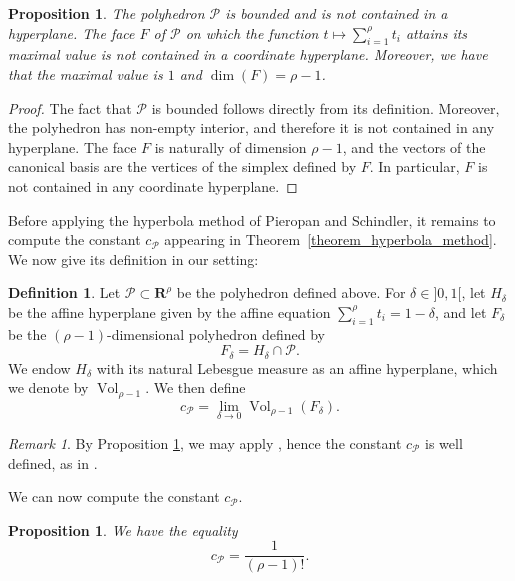 \documentclass{proc-l}
\newcommand{\R}{\mathbf{R}}
\DeclareMathOperator{\Vol}{Vol}
\newcommand{\stackP}{\mathcal{P}}
\newtheorem{prop}[theorem]{Proposition}
\theoremstyle{definition}
\newtheorem{definition}[theorem]{Definition}
\theoremstyle{remark}
\newtheorem{remark}[theorem]{Remark}
\numberwithin{equation}{section}
\begin{document}
\begin{prop}\label{proposition_assumptions_polyhedron}
    The polyhedron $\stackP$ is bounded and is not contained in a hyperplane. The face $F$  of $\mathcal{P}$ on which the function $t \mapsto \sum\limits_{i = 1}^{\rho } t_i$ attains its maximal value is not contained in a coordinate hyperplane. Moreover, we have that the maximal value is $1$ and $\dim(F) = \rho - 1$.
\end{prop}

\begin{proof}
The fact that $\stackP$ is bounded follows directly from its definition.
Moreover, the polyhedron has non-empty interior, and therefore it is not
contained in any hyperplane.
The face $F$ is naturally of dimension $\rho-1$, and the vectors of the
canonical basis are the vertices of the simplex defined by $F$.
In particular, $F$ is not contained in any coordinate hyperplane.
\end{proof}

Before applying the hyperbola method of Pieropan and Schindler,
it remains to compute the constant $c_{\stackP}$ appearing in
Theorem~\ref{theorem_hyperbola_method}. We now give its definition in our setting:

\begin{definition}\label{definition_constante_polytope_hyperbola_method}
    Let \(\stackP \subset \R^{\rho}\) be the polyhedron defined above.  For $\delta \in ]0,1[$, let $H_{\delta}$ be the affine hyperplane given by the affine equation $\sum\limits_{i = 1}^{\rho} t_i = 1 - \delta$, and let $F_{\delta}$ be the $(\rho - 1)$-dimensional polyhedron defined by 
    \[
        F_{\delta} = H_{\delta} \cap \stackP.
    \]
    We endow $H_{\delta}$ with its natural Lebesgue measure as an affine hyperplane, which we denote by $\Vol_{\rho - 1}$.  
    We then define
    \[
        c_{\stackP} = \lim_{\delta \to 0} \Vol_{\rho - 1}(F_{\delta}).
    \]
\end{definition}

\begin{remark}
    By Proposition \ref{proposition_assumptions_polyhedron}, we may apply \cite[Proposition~3.1]{pieropan_hyperbola_method}, hence the constant $c_{\stackP}$ is well defined, as in \cite[Equation~4.3]{pieropan_hyperbola_method}.
\end{remark}

We can now compute the constant $c_{\stackP}$.

\begin{prop}\label{proposition_computation_constant_polyhedron}
    We have the equality
    $$
    c_{\stackP} = \frac{1}{(\rho - 1)!} .
    $$ 
\end{prop}
\end{document}

